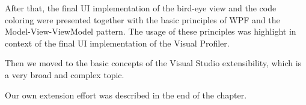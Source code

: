 After that, the final UI implementation of the bird-eye view and the code coloring were presented together with the basic principles of WPF and the Model-View-ViewModel pattern. The usage of these principles was highlight in context of the final UI implementation of the Visual Profiler.

Then we moved to the basic concepts of the Visual Studio extensibility, which is a very broad and complex topic.

Our own extension effort was described in the end of the chapter.











